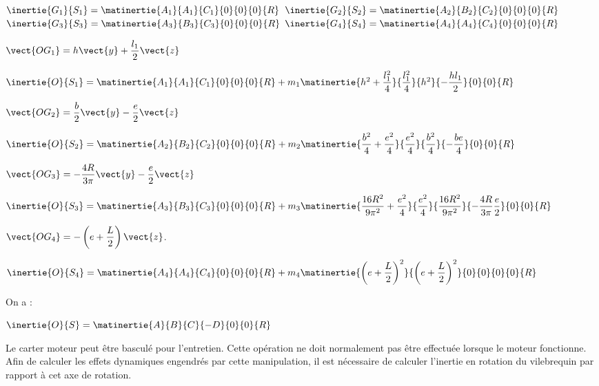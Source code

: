 \begin{multicols}{2}
\ifprof \begin{corrige} ~\\

$\inertie{G_1}{S_1}=\matinertie{A_1}{A_1}{C_1}{0}{0}{0}{R}$
$\inertie{G_2}{S_2}=\matinertie{A_2}{B_2}{C_2}{0}{0}{0}{R}$
$\inertie{G_3}{S_3}=\matinertie{A_3}{B_3}{C_3}{0}{0}{0}{R}$
$\inertie{G_4}{S_4}=\matinertie{A_4}{A_4}{C_4}{0}{0}{0}{R}$
\end{corrige}\else\fi


\ifprof \begin{corrige}

$\vect{OG_1} = h\vect{y}+\dfrac{l_1}{2}\vect{z}$

$\inertie{O}{S_1}=\matinertie{A_1}{A_1}{C_1}{0}{0}{0}{R}
+m_1\matinertie{h^2+\dfrac{l_1^2}{4}}{\dfrac{l_1^2}{4}}{h^2}{-\dfrac{hl_1}{2}}{0}{0}{R}$

$\vect{OG_2} = \dfrac{b}{2}\vect{y}-\dfrac{e}{2}\vect{z}$

$\inertie{O}{S_2}=\matinertie{A_2}{B_2}{C_2}{0}{0}{0}{R}
+m_2\matinertie{\dfrac{b^2}{4}+\dfrac{e^2}{4}}{\dfrac{e^2}{4}}{\dfrac{b^2}{4}}{-\dfrac{be}{4}}{0}{0}{R}$

$\vect{OG_3} = -\dfrac{4R}{3\pi}  \vect{y}-\dfrac{e}{2}\vect{z}$

$\inertie{O}{S_3}=\matinertie{A_3}{B_3}{C_3}{0}{0}{0}{R}
+m_3\matinertie{\dfrac{16R^2}{9\pi^2}+\dfrac{e^2}{4}}{\dfrac{e^2}{4}}{\dfrac{16R^2}{9\pi^2}}{-\dfrac{4R}{3\pi}\dfrac{e}{2}}{0}{0}{R}$

$\vect{OG_4} = -\left(e+\dfrac{L}{2}\right)\vect{z}$.

$\inertie{O}{S_4}=\matinertie{A_4}{A_4}{C_4}{0}{0}{0}{R}
+m_4\matinertie{\left(e+\dfrac{L}{2}\right)^2}{\left(e+\dfrac{L}{2}\right)^2}{0}{0}{0}{0}{R}$

On a : 

$\inertie{O}{S}=\matinertie{A}{B}{C}{-D}{0}{0}{R}$
\end{corrige}
\else\fi

Le carter moteur peut être basculé pour l’entretien. Cette opération ne doit normalement pas être effectuée lorsque le moteur fonctionne. Afin de calculer les effets dynamiques engendrés par cette manipulation, il est nécessaire de calculer l’inertie en rotation du vilebrequin par rapport à cet axe de rotation.


\end{multicols}

